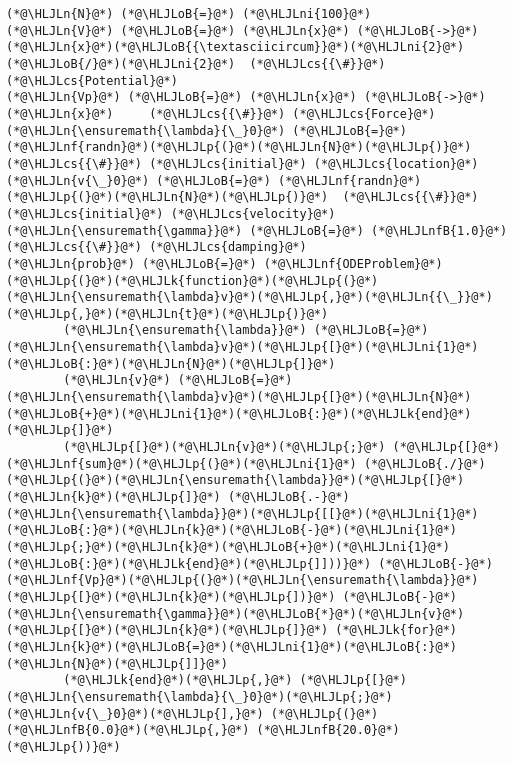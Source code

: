 \documentclass[12pt,landscape]{article}
\newcommand{\HLJLk}[1]{\textcolor[RGB]{148,91,176}{\textbf{#1}}}
\newcommand{\HLJLn}[1]{#1}
\newcommand{\HLJLnf}[1]{\textcolor[RGB]{66,102,213}{#1}}
\newcommand{\HLJLnfB}[1]{\textcolor[RGB]{59,151,46}{#1}}
\newcommand{\HLJLni}[1]{\textcolor[RGB]{59,151,46}{#1}}
\newcommand{\HLJLoB}[1]{\textcolor[RGB]{102,102,102}{\textbf{#1}}}
\newcommand{\HLJLp}[1]{#1}
\newcommand{\HLJLcs}[1]{\textcolor[RGB]{153,153,119}{\textit{#1}}}
\begin{document}
{\begin{lstlisting}
(*@\HLJLn{N}@*) (*@\HLJLoB{=}@*) (*@\HLJLni{100}@*)
(*@\HLJLn{V}@*) (*@\HLJLoB{=}@*) (*@\HLJLn{x}@*) (*@\HLJLoB{->}@*) (*@\HLJLn{x}@*)(*@\HLJLoB{{\textasciicircum}}@*)(*@\HLJLni{2}@*)(*@\HLJLoB{/}@*)(*@\HLJLni{2}@*)  (*@\HLJLcs{{\#}}@*) (*@\HLJLcs{Potential}@*)
(*@\HLJLn{Vp}@*) (*@\HLJLoB{=}@*) (*@\HLJLn{x}@*) (*@\HLJLoB{->}@*) (*@\HLJLn{x}@*)     (*@\HLJLcs{{\#}}@*) (*@\HLJLcs{Force}@*)
(*@\HLJLn{\ensuremath{\lambda}{\_}0}@*) (*@\HLJLoB{=}@*) (*@\HLJLnf{randn}@*)(*@\HLJLp{(}@*)(*@\HLJLn{N}@*)(*@\HLJLp{)}@*)  (*@\HLJLcs{{\#}}@*) (*@\HLJLcs{initial}@*) (*@\HLJLcs{location}@*)
(*@\HLJLn{v{\_}0}@*) (*@\HLJLoB{=}@*) (*@\HLJLnf{randn}@*)(*@\HLJLp{(}@*)(*@\HLJLn{N}@*)(*@\HLJLp{)}@*)  (*@\HLJLcs{{\#}}@*) (*@\HLJLcs{initial}@*) (*@\HLJLcs{velocity}@*)
(*@\HLJLn{\ensuremath{\gamma}}@*) (*@\HLJLoB{=}@*) (*@\HLJLnfB{1.0}@*)    (*@\HLJLcs{{\#}}@*) (*@\HLJLcs{damping}@*)
(*@\HLJLn{prob}@*) (*@\HLJLoB{=}@*) (*@\HLJLnf{ODEProblem}@*)(*@\HLJLp{(}@*)(*@\HLJLk{function}@*)(*@\HLJLp{(}@*)(*@\HLJLn{\ensuremath{\lambda}v}@*)(*@\HLJLp{,}@*)(*@\HLJLn{{\_}}@*)(*@\HLJLp{,}@*)(*@\HLJLn{t}@*)(*@\HLJLp{)}@*)
        (*@\HLJLn{\ensuremath{\lambda}}@*) (*@\HLJLoB{=}@*) (*@\HLJLn{\ensuremath{\lambda}v}@*)(*@\HLJLp{[}@*)(*@\HLJLni{1}@*)(*@\HLJLoB{:}@*)(*@\HLJLn{N}@*)(*@\HLJLp{]}@*)
        (*@\HLJLn{v}@*) (*@\HLJLoB{=}@*) (*@\HLJLn{\ensuremath{\lambda}v}@*)(*@\HLJLp{[}@*)(*@\HLJLn{N}@*)(*@\HLJLoB{+}@*)(*@\HLJLni{1}@*)(*@\HLJLoB{:}@*)(*@\HLJLk{end}@*)(*@\HLJLp{]}@*)
        (*@\HLJLp{[}@*)(*@\HLJLn{v}@*)(*@\HLJLp{;}@*) (*@\HLJLp{[}@*)(*@\HLJLnf{sum}@*)(*@\HLJLp{(}@*)(*@\HLJLni{1}@*) (*@\HLJLoB{./}@*) (*@\HLJLp{(}@*)(*@\HLJLn{\ensuremath{\lambda}}@*)(*@\HLJLp{[}@*)(*@\HLJLn{k}@*)(*@\HLJLp{]}@*) (*@\HLJLoB{.-}@*) (*@\HLJLn{\ensuremath{\lambda}}@*)(*@\HLJLp{[[}@*)(*@\HLJLni{1}@*)(*@\HLJLoB{:}@*)(*@\HLJLn{k}@*)(*@\HLJLoB{-}@*)(*@\HLJLni{1}@*)(*@\HLJLp{;}@*)(*@\HLJLn{k}@*)(*@\HLJLoB{+}@*)(*@\HLJLni{1}@*)(*@\HLJLoB{:}@*)(*@\HLJLk{end}@*)(*@\HLJLp{]]))}@*) (*@\HLJLoB{-}@*) (*@\HLJLnf{Vp}@*)(*@\HLJLp{(}@*)(*@\HLJLn{\ensuremath{\lambda}}@*)(*@\HLJLp{[}@*)(*@\HLJLn{k}@*)(*@\HLJLp{])}@*) (*@\HLJLoB{-}@*)  (*@\HLJLn{\ensuremath{\gamma}}@*)(*@\HLJLoB{*}@*)(*@\HLJLn{v}@*)(*@\HLJLp{[}@*)(*@\HLJLn{k}@*)(*@\HLJLp{]}@*) (*@\HLJLk{for}@*) (*@\HLJLn{k}@*)(*@\HLJLoB{=}@*)(*@\HLJLni{1}@*)(*@\HLJLoB{:}@*)(*@\HLJLn{N}@*)(*@\HLJLp{]]}@*)
        (*@\HLJLk{end}@*)(*@\HLJLp{,}@*) (*@\HLJLp{[}@*)(*@\HLJLn{\ensuremath{\lambda}{\_}0}@*)(*@\HLJLp{;}@*) (*@\HLJLn{v{\_}0}@*)(*@\HLJLp{],}@*) (*@\HLJLp{(}@*)(*@\HLJLnfB{0.0}@*)(*@\HLJLp{,}@*) (*@\HLJLnfB{20.0}@*)(*@\HLJLp{))}@*)

\end{lstlisting}}
\end{document}
